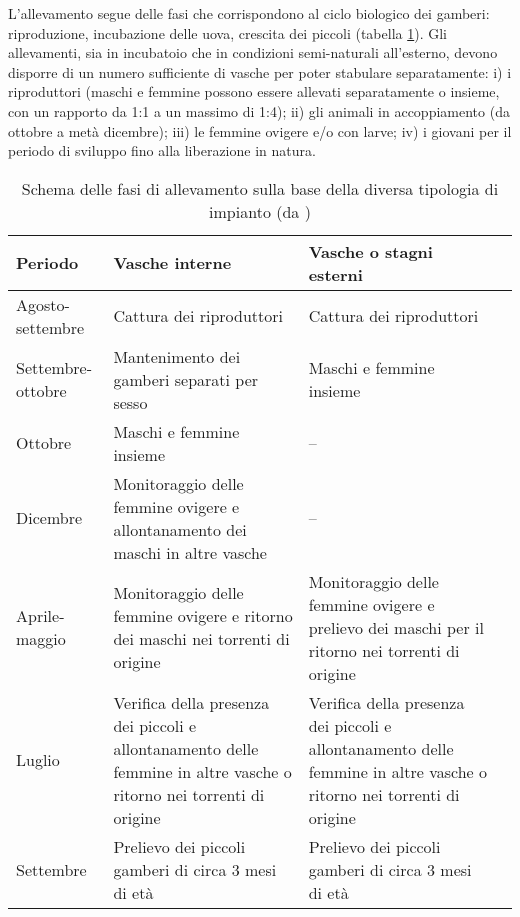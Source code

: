 \documentclass[11pt,a4paper,italian,twoside,openany]{memoir}
\begin{document}
L'allevamento segue delle fasi che corrispondono al ciclo biologico dei gamberi: riproduzione, incubazione delle uova, crescita dei piccoli (tabella \ref{tab_3}). Gli allevamenti, sia in incubatoio che in condizioni semi-naturali all'esterno, devono disporre di un numero sufficiente di vasche per poter stabulare separatamente: i) i riproduttori (maschi e femmine possono essere allevati separatamente o insieme, con un rapporto da 1:1 a un massimo di 1:4); ii) gli animali in accoppiamento (da ottobre a metà dicembre); iii) le femmine ovigere e/o con larve; iv) i giovani per il periodo di sviluppo fino alla liberazione in natura. 

\begin{table}[]
\centering
\begin{tabular}{p{}p{}p{}l@{}}
\toprule
\textbf{Periodo}  & \textbf{Vasche interne} & \textbf{Vasche o stagni esterni}        \\ \midrule
Agosto-settembre  & Cattura dei riproduttori & Cattura dei riproduttori \\
\rowcolor[HTML]{EFEFEF}  Settembre-ottobre & Mantenimento dei gamberi separati per sesso & Maschi e femmine insieme \\
Ottobre & Maschi e femmine insieme & -- \\
\rowcolor[HTML]{EFEFEF} Dicembre          & Monitoraggio delle femmine ovigere e allontanamento dei maschi in altre vasche & -- \\
Aprile-maggio     & Monitoraggio delle femmine ovigere e ritorno dei maschi nei torrenti di origine & Monitoraggio delle femmine ovigere e prelievo dei maschi per il ritorno nei torrenti di origine \\
\rowcolor[HTML]{EFEFEF}Luglio & Verifica della presenza dei piccoli e allontanamento delle femmine in altre vasche o ritorno nei torrenti di origine & Verifica della presenza dei piccoli e allontanamento delle femmine in altre vasche o ritorno nei torrenti di origine \\
Settembre & Prelievo dei piccoli gamberi di circa 3 mesi di età & Prelievo dei piccoli gamberi di circa 3 mesi di età \\ \bottomrule
\end{tabular}
\caption{Schema delle fasi di allevamento sulla base della diversa tipologia di impianto (da \cite{AA.VV. 2014})}
\label{tab_3}
\end{table}
\end{document}
